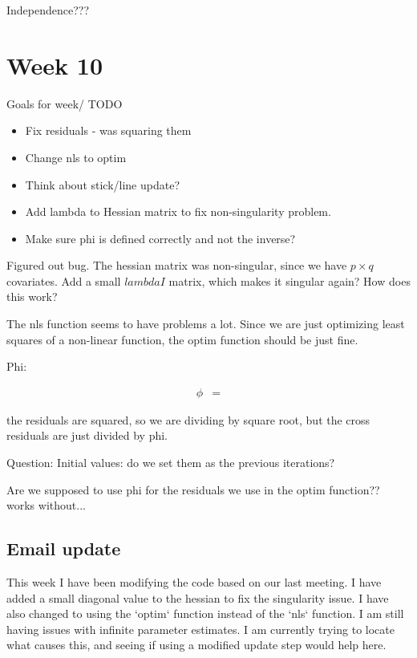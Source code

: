 \documentclass[10pt]{article}
\begin{document}
Independence???

\section{Week 10}

Goals for week/ TODO
\begin{itemize}
  \item Fix residuals - was squaring them

  \item Change nls to optim
  \item Think about stick/line update?
  \item Add lambda to Hessian matrix to fix non-singularity problem.
  \item Make sure phi is defined correctly and not the inverse?
\end{itemize}

Figured out bug. The hessian matrix was non-singular, since we have $p \times q$ covariates. Add a small $lambda I$ matrix, which makes it singular again? How does this work?

The nls function seems to have problems a lot. Since we are just optimizing least squares of a non-linear function, the optim function should be just fine.

Phi:

\begin{align*}
  \phi &=
\end{align*}

the residuals are squared, so we are dividing by square root, but the cross residuals are just divided by phi.

Question:
Initial values: do we set them as the previous iterations?


Are we supposed to use phi for the residuals we use in the optim function?? works without...



\subsection{Email update}
This week I have been modifying the code based on our last meeting. I have added a small diagonal value to the hessian to fix the singularity issue. I have also changed to using the `optim` function instead of the `nls` function. I am still having issues with infinite parameter estimates. I am currently trying to locate what causes this, and seeing if using a modified update step would help here. 
\end{document}
